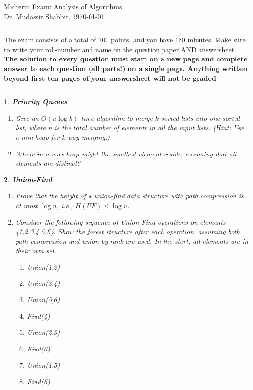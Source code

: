 \documentclass[%
addpoints]{exam}
\theoremstyle{problem}
\newtheorem{p}{}
\begin{document}
 \pagestyle{empty}
 \begin{FlushLeft}
Midterm Exam: Analysis of Algorithms\\Dr. Mudassir Shabbir,
\today
\end{FlushLeft}

	
\thispagestyle{myheadings}
\rule{550pt}{1.5pt}

The exam consists of a total of 100 points, and you have 180 minutes. Make sure to write your roll-number and name on the question paper AND answersheet. 
\textbf{The solution to every question must start on a new page and complete answer to each question (all parts!) on a single page. 
Anything written beyond first ten pages of your answersheet will not be graded!}

\rule{550pt}{1.5pt}

\begin{p}
    {\bf Priority Queues}
    \begin{enumerate}
        \item Give an \( O(n \log k) \)-time algorithm to merge \( k \) sorted lists into one sorted list, where \( n \) is the total number of elements in all the input lists. (Hint: Use a min-heap for \( k \)-way merging.)
        \item Where in a max-heap might the smallest element reside, assuming that all elements are distinct?
    \end{enumerate}
    \hfill
\end{p}

\begin{p}
    {\bf Union-Find}
    \begin{enumerate}
        \item Prove that the height of a union-find data structure with path compression is at most $\log n$, i.e., $H(UF) \leq \log n$.  
        \item Consider the following sequence of Union-Find operations on elements \{1,2,3,4,5,6\}. Show the forest structure after each operation, assuming both path compression and union by rank are used. In the start, all elements are in their own set.
    \begin{enumerate}
        \item Union(1,2)
        \item Union(3,4)
        \item Union(5,6)
        \item Find(4)
        \item Union(2,3)
        \item Find(6)
        \item Union(1,5)
        \item Find(6)
    \end{enumerate}
\end{enumerate}  
\hfill
\end{p}
\end{document}
